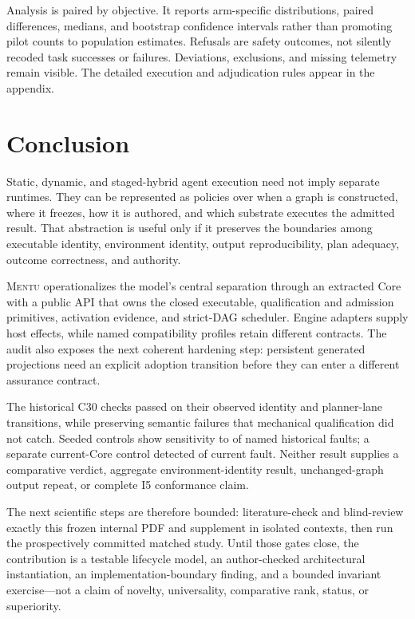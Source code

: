 \documentclass[11pt]{article}
\newcommand{\mentu}{\textsc{Mentu}}
\begin{document}
Analysis is paired by objective.  It reports arm-specific distributions,
paired differences, medians, and bootstrap confidence intervals rather than
promoting pilot counts to population estimates.  Refusals are safety outcomes,
not silently recoded task successes or failures.  Deviations, exclusions, and
missing telemetry remain visible.  The detailed execution and adjudication
rules appear in the appendix.

\section{Conclusion}

Static, dynamic, and staged-hybrid agent execution need not imply separate
runtimes.  They can be represented as policies over when a graph is
constructed, where it freezes, how it is authored, and which substrate executes
the admitted result.  That abstraction is useful only if it preserves the
boundaries among executable identity, environment identity, output
reproducibility, plan adequacy, outcome correctness, and authority.

\mentu{} operationalizes the model's central separation through an extracted
Core with a public API that owns the closed executable, qualification and
admission primitives, activation evidence, and strict-DAG scheduler. Engine
adapters supply host effects, while named compatibility profiles retain
different contracts. The audit also exposes the next coherent hardening step:
persistent generated projections need an explicit adoption transition before
they can enter a different assurance contract.

The historical C30 checks passed on their observed identity and planner-lane
transitions, while preserving semantic failures that mechanical qualification
did not catch. Seeded controls show sensitivity to
\HistoricalDetectorControlPassCount{} of
\HistoricalDetectorControlCount{} named historical faults; a separate
current-Core control detected \CurrentDetectorControlPassCount{} of
\CurrentDetectorControlCount{} current fault. Neither result supplies a
comparative verdict, aggregate environment-identity result,
unchanged-graph output repeat, or complete I5 conformance claim.

The next scientific steps are therefore bounded: literature-check and
blind-review exactly this frozen internal PDF and supplement in isolated
contexts, then run the prospectively committed matched study. Until those gates
close, the contribution is a testable lifecycle model, an author-checked
architectural instantiation, an implementation-boundary finding, and a bounded
invariant exercise---not a claim of novelty, universality, comparative rank,
status, or superiority.
\end{document}

